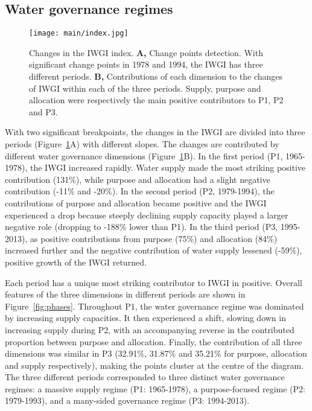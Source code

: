 \subsection{Water governance regimes}
\label{Res.1}

\begin{figure}[ht!]
	\centering
	\texttt{[image: main/index.jpg]}
	\caption{Changes in the IWGI index.
	\textbf{A,} Change points detection. With significant change points in 1978 and 1994, the IWGI has three different periods.
	\textbf{B,} Contributions of each dimension to the changes of IWGI within each of the three periods. Supply, purpose and allocation were respectively the main positive contributors to P1, P2 and P3.
	}
	\label{fig:IWGI}
\end{figure}

With two significant breakpoints, the changes in the IWGI are divided into three periods (Figure~\ref{fig:IWGI}A) with different slopes.
The changes are contributed by different water governance dimensions (Figure~\ref{fig:IWGI}B).
In the first period (P1, 1965-1978), the IWGI increased rapidly.
Water supply made the most striking positive contribution (131\%), while purpose and allocation had a slight negative contribution (-11\% and -20\%).
In the second period (P2, 1979-1994), the contributions of purpose and allocation became positive and the IWGI experienced a drop because steeply declining supply capacity played a larger negative role (dropping to -188\% lower than P1).
In the third period (P3, 1995-2013), as positive contributions from purpose (75\%) and allocation (84\%) increased further and the negative contribution of water supply lessened (-59\%), positive growth of the IWGI returned.

Each period has a unique most striking contributor to IWGI in positive. Overall features of the three dimensions in different periods are shown in Figure~\ref{fig:phases}.
Throughout P1, the water governance regime was dominated by increasing supply capacities.
It then experienced a shift, slowing down in increasing supply during P2, with an accompanying reverse in the contributed proportion between purpose and allocation. Finally, the contribution of all three dimensions was similar in P3 (32.91\%, 31.87\% and 35.21\% for purpose, allocation and supply respectively), making the points cluster at the centre of the diagram.
The three different periods corresponded to three distinct water governance regimes: a massive supply regime (P1: 1965-1978), a purpose-focused regime (P2: 1979-1993), and a many-sided governance regime (P3: 1994-2013).


